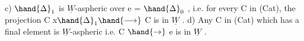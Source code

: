 c) $\hand{\Delta}_1$ is $\underline{W}$-aspheric over e = $\hand{\Delta}_0$ , i.e. for every C in (Cat), the
projection C x$\hand{\Delta}_1 \hand{\longrightarrow}$ C is in $\underline{W}$ .
d) Any C in (Cat) which has a final element is $\underline{W}$-aspheric i.e.
C $\hand{\to}$ e is in $\underline{W}$ .

